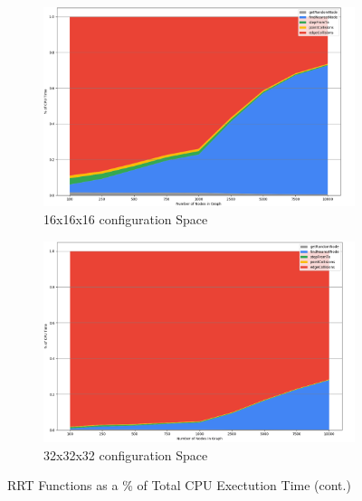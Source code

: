 \newpage
\begin{figure}[H]\ContinuedFloat
\begin{center}
    \begin{subfigure}{\textwidth}
    \begin{center}
    \includegraphics[width=\linewidth,height=0.3\paperheight]{chapters/chapter2/img/profiling/16x16x16/performance.png}
    \caption{16x16x16 \gls{configuration} Space}
    \label{subfig:16x16x16rrt}
    \end{center}
    \end{subfigure}
    \begin{subfigure}{\textwidth}
    \begin{center}
    \includegraphics[width=\linewidth,height=0.3\paperheight]{chapters/chapter2/img/profiling/32x32x32/performance.png}
    \caption{32x32x32 \gls{configuration} Space}
    \label{subfig:32x32x32rrt}
    \end{center}
    \end{subfigure} 
    
    \caption{\gls{RRT} Functions as a \% of Total CPU Exectution Time (cont.)}
    \label{fig:rrt_profiling}
\end{center}
\end{figure}
